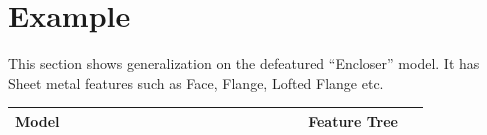 \section{Example}  \label{sec:abstraction:results}

This section shows generalization on the defeatured ``Encloser'' model. It has Sheet metal features such as Face, Flange, Lofted Flange etc.



\begin{center}
\begin{longtable}[h]{@{}p{0.6\linewidth} p{0.25\linewidth}@{}}
\toprule

Model & Feature Tree \\
 \midrule


\end{longtable}
\end{center}
